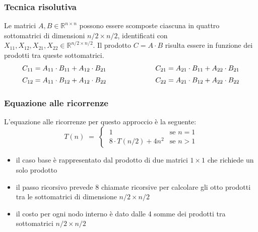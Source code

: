 \subsubsection*{Tecnica risolutiva}
Le matrici \(A, B \in \mathbb{R}^{n \times n}\) possono essere scomposte ciascuna in quattro sottomatrici di dimensioni
\(n/2 \times n/2\), identificati con \(X_{11}, X_{12}, X_{21}, X_{22} \in \mathbb{R}^{n/2 \times n/2}\). Il prodotto
\(C = A \cdot B\) risulta essere in funzione dei prodotti tra queste sottomatrici.
\[\begin{array}{c c}
	C_{11} = A_{11} \cdot B_{11} + A_{12} \cdot B_{21} \qquad\quad & \qquad\quad C_{21} = A_{21} \cdot B_{11} + A_{22} \cdot B_{21} \\[5pt]
	C_{12} = A_{11} \cdot B_{12} + A_{12} \cdot B_{22} \qquad\quad & \qquad\quad C_{22} = A_{21} \cdot B_{12} + A_{22} \cdot B_{22}
\end{array}\]

\subsubsection*{Equazione alle ricorrenze}
L'equazione alle ricorrenze per questo approccio è la seguente:
\[T(n) \; = \; \begin{cases}
	\; 1 & \text{se } n = 1 \\[3pt]
	\; 8 \cdot T(n/2) + 4 n^2 & \text{se } n > 1
\end{cases}\]
\begin{itemize}
	\item il caso base è rappresentato dal prodotto di due matrici \(1 \times 1\) che richiede un solo prodotto
	\item il passo ricorsivo prevede 8 chiamate ricorsive per calcolare gli otto prodotti tra le sottomatrici di dimensione \(n/2 \times n/2\)
	\item il costo per ogni nodo interno è dato dalle 4 somme dei prodotti tra sottomatrici \(n/2 \times n/2\)
\end{itemize}

